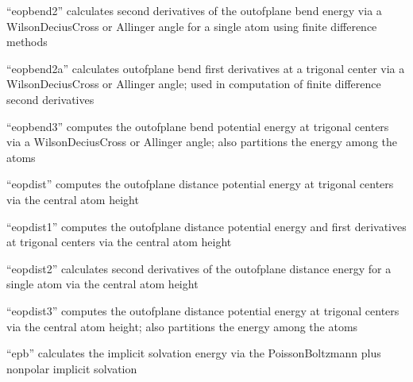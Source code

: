 \documentclass[letterpaper,11pt,english]{sphinxmanual}
\begin{document}
\sphinxAtStartPar
{}

\sphinxAtStartPar
“eopbend2” calculates second derivatives of the out\sphinxhyphen{}of\sphinxhyphen{}plane bend energy via a Wilson\sphinxhyphen{}Decius\sphinxhyphen{}Cross or Allinger angle for a single atom using finite difference methods

\sphinxAtStartPar
{}

\sphinxAtStartPar
“eopbend2a” calculates out\sphinxhyphen{}of\sphinxhyphen{}plane bend first derivatives at a trigonal center via a Wilson\sphinxhyphen{}Decius\sphinxhyphen{}Cross or Allinger angle; used in computation of finite difference second derivatives

\sphinxAtStartPar
{}

\sphinxAtStartPar
“eopbend3” computes the out\sphinxhyphen{}of\sphinxhyphen{}plane bend potential energy at trigonal centers via a Wilson\sphinxhyphen{}Decius\sphinxhyphen{}Cross or Allinger angle; also partitions the energy among the atoms

\sphinxAtStartPar
{}

\sphinxAtStartPar
“eopdist” computes the out\sphinxhyphen{}of\sphinxhyphen{}plane distance potential energy at trigonal centers via the central atom height

\sphinxAtStartPar
{}

\sphinxAtStartPar
“eopdist1” computes the out\sphinxhyphen{}of\sphinxhyphen{}plane distance potential energy and first derivatives at trigonal centers via the central atom height

\sphinxAtStartPar
{}

\sphinxAtStartPar
“eopdist2” calculates second derivatives of the out\sphinxhyphen{}of\sphinxhyphen{}plane distance energy for a single atom via the central atom height

\sphinxAtStartPar
{}

\sphinxAtStartPar
“eopdist3” computes the out\sphinxhyphen{}of\sphinxhyphen{}plane distance potential energy at trigonal centers via the central atom height; also partitions the energy among the atoms

\sphinxAtStartPar
{}

\sphinxAtStartPar
“epb” calculates the implicit solvation energy via the Poisson\sphinxhyphen{}Boltzmann plus nonpolar implicit solvation
\end{document}
